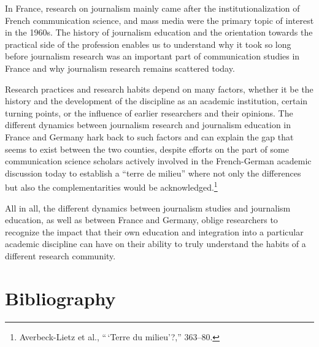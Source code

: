 \documentclass{tufte-handout}
\begin{document}
In France, research on journalism mainly came after the
institutionalization of French communication science, and mass media
were the primary topic of interest in the 1960s. The history of
journalism education and the orientation towards the practical side of
the profession enables us to understand why it took so long before
journalism research was an important part of communication studies in
France and why journalism research remains scattered today.

Research practices and research habits depend on many factors, whether
it be the history and the development of the discipline as an academic
institution, certain turning points, or the influence of earlier
researchers and their opinions. The different dynamics between
journalism research and journalism education in France and Germany hark
back to such factors and can explain the gap that seems to exist between
the two counties, despite efforts on the part of some communication
science scholars actively involved in the French-German academic
discussion today to establish a ``terre de milieu'' where not only the
differences but also the complementarities would be
acknowledged.\footnote{Averbeck-Lietz et al., ``\,`Terre du milieu'?,''
  363--80.}

All in all, the different dynamics between journalism studies and
journalism education, as well as between France and Germany, oblige
researchers to recognize the impact that their own education and
integration into a particular academic discipline can have on their
ability to truly understand the habits of a different research
community.




\section{Bibliography}\label{bibliography}
\end{document}
